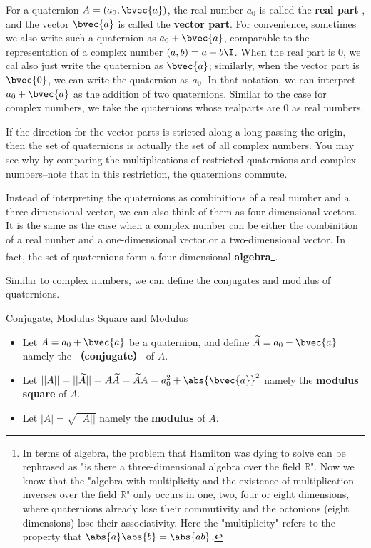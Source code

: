 For a quaternion $A=(a_0, \bvec{a})$, the real number $a_0$ is called the \textbf{real part} , and the vector $\bvec{a}$ is called the \textbf{vector part}. For convenience, sometimes we also write such a quaternion as $a_0+\bvec{a}$, comparable to the representation of a complex number $(a, b)=a+b\I$. When the real part is $0$, we cal also just write the quaternion as $\bvec{a}$; similarly, when the vector part is $\bvec{0}$, we can write the quaternion as $a_0$. In that notation, we can interpret $a_0+\bvec{a}$ as the addition of two quaternions. Similar to the case for complex numbers, we take the quaternions whose realparts are $0$ as real numbers. 


If the direction for the vector parts is stricted along a long passing the origin, then the set of quaternions is actually the set of all complex numbers. You may see why by comparing the multiplications of restricted quaternions and complex numbers--note that in this restriction, the quaternions commute. 

Instead of interpreting the quaternions as combinitions of a real number and a three-dimensional vector, we can also think of them as four-dimensional vectors. It is the same as the case when a complex number can be either the combinition of a real nunber and a one-dimensional vector,or a two-dimensional vector. In fact, the set of quaternions form a four-dimensional \textbf{algebra}\footnote{In terms of algebra, the problem that Hamilton was dying to solve can be rephrased as "is there a three-dimensional algebra over the field $\mathbb{R}$". Now we know that the "algebra with multiplicity and the existence of multiplication inverses over the field $\mathbb{R}$" only occurs in one, two, four or eight dimensions, where quaternions already lose their commutivity and the octonions (eight dimensions) lose their associativity. Here the "multiplicity" refers to the property that $\abs{a}\abs{b}=\abs{ab}$. }.

Similar to complex numbers, we can define the conjugates and modulus of quaternions. 



\begin{definition}{Conjugate, Modulus Square and Modulus}
\begin{itemize}
\item Let $A=a_0+\bvec{a}$ be a quaternion, and define $\widetilde{A}=a_0-\bvec{a}$ namely the \textbf{（conjugate）} of $A$. 
\item Let $||A||=||\widetilde{A}||=A\widetilde{A}=\widetilde{A}A=a_0^2+ \abs{\bvec{a}}^2$ namely the \textbf{modulus square} of $A$. 
\item Let $|A|=\sqrt{||A||}$ namely the \textbf{modulus} of $A$. 
\end{itemize}
\end{definition}

